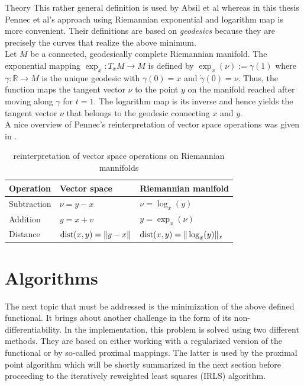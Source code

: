 \begin{chapter}{Theory}
This rather general definition is used by Absil et al \cite{Absil2009} whereas in this thesis Pennec et al's \cite{Arsigny} approach using Riemannian exponential and logarithm map is more convenient. Their definitions are based on
\emph{geodesics} because they are precisely the curves that realize the above minimum.\\

Let $M$ be a connected, geodesically complete Riemannian manifold. The exponential mapping $\exp_x:T_xM\to M$ is defined by $\exp_x(\nu):=\gamma(1)$
where $\gamma:\mathbb{R}\to M$ is the unique geodesic with $\gamma(0)=x$ and $\dot{\gamma}(0)=\nu$.
Thus, the function maps the tangent vector $\nu$ to the point $y$ on the manifold reached after moving along $\gamma$ for $t=1$.
The logarithm map is its inverse and hence yields the tangent vector $\nu$ that belongs to the geodesic connecting $x$ and $y$. \\

A nice overview of Pennec's reinterpretation of vector space operations was given in \cite{mara}.

\begin{table}[h!]
\centering
\begin{tabular}{|l|l|l|}
\hline
Operation   & Vector space &	Riemannian manifold \\
\hline
Subtraction & $\nu=y-x$	& $\nu=\log_x(y)$	\\
Addition    & $y=x+v$	& $y=\exp_x(\nu)$	\\
Distance    & $\operatorname{dist}(x,y)=\| y-x \|$	& $ \operatorname{dist}(x,y)=\| \log_x(y) \|_x$ \\
\hline
\end{tabular}
\caption[Comparison vector space and manifold operations]{reinterpretation of vector space operations on Riemannian mannifolds}
\end{table}

\section{Algorithms} %
\label{sec:Algorithms}
The next topic that must be addressed is the minimization of the above defined functional. It brings about another challenge in the form of its non-differentiability.
In the implementation, this problem is solved using two different methods. They are based on either working with a regularized version of the functional or by so-called
proximal mappings. The latter is used by the proximal point algorithm which will be shortly summarized in the next section before proceeding to
the iteratively reweighted least squares (IRLS) algorithm.



\end{chapter}
